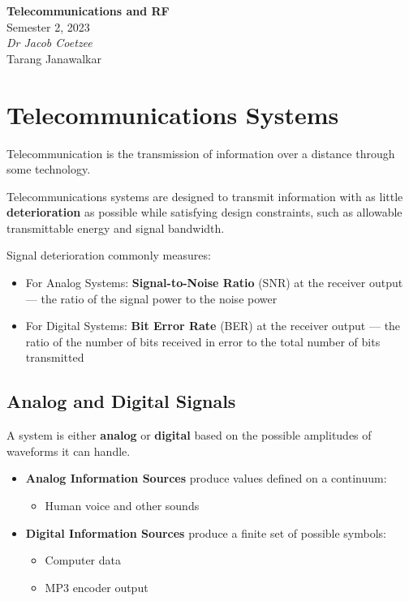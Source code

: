 \documentclass{article}
\date{}
\newcommand{\unitName}{Telecommunications and RF}
\newcommand{\unitTime}{Semester 2, 2023}
\newcommand{\unitCoordinator}{Dr Jacob Coetzee}
\newcommand{\documentAuthors}{Tarang Janawalkar}
\begin{document}
%
\begin{titlepage}
    \vspace*{\fill}
    \begin{center}
        \LARGE{\textbf{\unitName}} \\[0.1in]
        \normalsize{\unitTime} \\[0.2in]
        \normalsize\textit{\unitCoordinator} \\[0.2in]
        \documentAuthors
    \end{center}
    \vspace*{\fill}
    \doclicenseThis
    \thispagestyle{empty}
\end{titlepage}
\newpage
%
\tableofcontents
\newpage
%
\section{Telecommunications Systems}
Telecommunication is the transmission of information over a distance
through some technology.

Telecommunications systems are designed to transmit information with as
little \textbf{deterioration} as possible while satisfying design
constraints, such as allowable transmittable energy and signal
bandwidth.

Signal deterioration commonly measures:
\begin{itemize}
    \item For Analog Systems: \textbf{Signal-to-Noise Ratio} (SNR) at
          the receiver output --- the ratio of the signal power to the
          noise power
    \item For Digital Systems: \textbf{Bit Error Rate} (BER) at the
          receiver output --- the ratio of the number of bits received
          in error to the total number of bits transmitted
\end{itemize}
\subsection{Analog and Digital Signals}
A system is either \textbf{analog} or \textbf{digital} based on the
possible amplitudes of waveforms it can handle.
\begin{itemize}
    \item \textbf{Analog Information Sources} produce values defined on
          a continuum:
          \begin{itemize}
              \item Human voice and other sounds
          \end{itemize}
    \item \textbf{Digital Information Sources} produce a finite set of
          possible symbols:
          \begin{itemize}
              \item Computer data
              \item MP3 encoder output
          \end{itemize}
\end{itemize}
\end{document}
